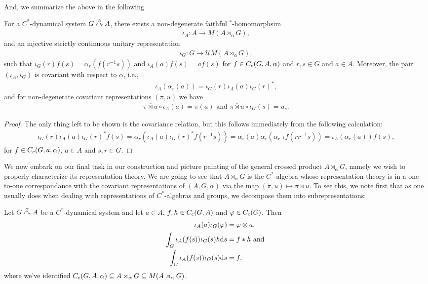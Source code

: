 And, we summarize the above in the following
\begin{proposition}
	For a $C^*$-dynamical system $G \stackrel{\alpha}{\curvearrowright} A$, there exists a non-degenerate faithful $^*$-homomorphsim 
	\begin{align*}
	\iota_A \colon A \to M(A \rtimes_\alpha G),	
	\end{align*}
	and an injective strictly continuous unitary representation 
	\begin{align*}
		\iota_G \colon G \to \mathcal{U}M(A \rtimes_\alpha G),
	\end{align*}
	such that $\iota_G(r) f(s) = \alpha_r(f(r^{-1}s))$  and $\iota_A(a) f(s) = af(s)$ for $f \in C_c(G,A,\alpha)$ and $r,s \in G$ and $a \in A$. Moreover, the pair $(\iota_A,\iota_G)$ is covariant with respect to $\alpha$, i.e., 
	\begin{align*}
		\iota_A(\alpha_r (a) ) = \iota_G(r)  \iota_A(a) \iota_G(r)^*,
	\end{align*}
	and for non-degenerate covariant representations $(\pi,u)$ we have
	\begin{align*}
		\overline{\pi \rtimes u} \circ \iota_A(a) = \pi(a) \text{ and } \overline{\pi \rtimes u } \circ \iota_G (s) = u_s.
	\end{align*}
	\label{cross:iotaprop}
\end{proposition}
\begin{proof}
	The only thing left to be shown is the covariance relation, but this follows immediately from the following calculation:
	\begin{align*}
		\iota_G(r) \iota_A(a) \iota_G(r)^* f(s) = \alpha_r(\iota_A(a) \iota_G(r)^{*}f(r^{-1}s)) = \alpha_r(a) \alpha_r ( \alpha_{r^{-1}}f(r r^{-1}s))= \iota_A(\alpha_r(a)) f(s),
	\end{align*}
	for $f \in C_c(G,a,\alpha)$, $a \in A$ and $s,r \in G$.
\end{proof}
We now embark on our final task in our construction and picture painting of the general crossed product $A \rtimes_ \alpha G$, namely we wish to properly characterize its representation theory. We are going to see that $A \rtimes_\alpha G$ is the $C^*$-algebra whose representation theory is in a one-to-one correspondance with the covariant representations of $(A,G,\alpha)$ via the map $(\pi,u) \mapsto \pi \rtimes u$. To see this, we note first that as one usually does when dealing with representations of $C^*$-algebras and groups, we decompose them into subrepresentations:
\begin{corollary}
	Let $G \stackrel{\alpha}{\curvearrowright} A$ be a $C^*$-dynamical system and let $a \in A$, $f,h \in C_c(G,A)$ and $\varphi \in C_c(G)$. Then
\begin{align*}
	\iota_A(a) \iota_G(\varphi) &= \varphi \otimes a,\\
	\int_G \iota_A(f(s)) \iota_G(s)h  \mathrm{d} s &= f \ast h \text{ and }\\
	\int_G \iota_A(f(s)) \iota_G(s) \mathrm{d} s & = f,
\end{align*}
where we've identified $C_c(G,A,\alpha) \subseteq A \rtimes_\alpha G \subseteq M(A \rtimes_\alpha G)$.
	\label{cross:iotaresults}
\end{corollary}
